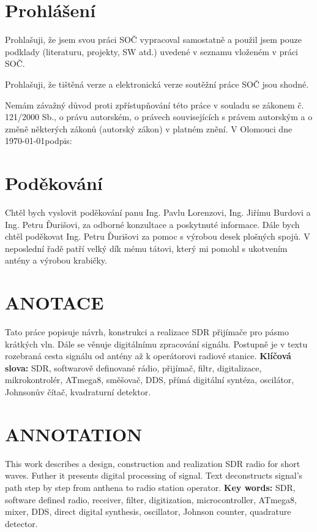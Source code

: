 \clearpage
\vspace*{\fill}
\section*{Prohlášení}
\indent\indent Prohlašuji, že jsem svou práci SOČ vypracoval samostatně a použil jsem pouze podklady (literaturu, projekty, SW atd.) uvedené v seznamu vloženém v práci SOČ.
	
Prohlašuji, že tištěná verze a elektronická verze soutěžní práce SOČ jsou shodné.
	
Nemám závažný důvod proti zpřístupňování této práce v souladu se zákonem č. 121/2000 Sb., o právu autorském, o právech souvisejících s právem autorským a o změně některých zákonů (autorský zákon) v platném znění. 
	\newline\newline
	V Olomouci dne \today\hspace*{4cm}podpis: \dotfill\newline

\clearpage
\vspace*{\fill}	
\section*{Poděkování}
\indent\indent Chtěl bych vyslovit poděkování panu Ing. Pavlu Lorenzovi, Ing. Jiřímu Burdovi a Ing. Petru Ďurišovi, za odborné konzultace a poskytnuté informace. Dále bych chtěl poděkovat Ing. Petru Ďurišovi za pomoc s výrobou desek plošných spojů. V neposlední řadě patří velký dík mému tátovi, který mi pomohl s ukotvením antény a výrobou krabičky.

\clearpage
\section*{ANOTACE}
\indent\indent Tato práce popisuje návrh, konstrukci a realizace SDR přijímače pro pásmo krátkých vln. Dále se věnuje digitálnímu zpracování signálu. Postupně je v textu rozebraná cesta signálu od antény až k operátorovi radiové stanice.
\newline\newline	
\noindent\textbf{Klíčová slova:}
SDR, softwarově definované rádio, přijímač, filtr, digitalizace, mikrokontrolér, ATmega8, směšovač, DDS, přímá digitální syntéza, oscilátor, Johnsonův čítač, kvadraturní detektor.

\vspace{3cm}

\section*{ANNOTATION}
\indent\indent This work describes a design, construction and realization SDR radio for short waves. Futher it presents digital processing of signal. Text deconstructs signal's path step by step from anthena to radio station operator.
\newline\newline
\noindent\textbf{Key words:}
SDR, software defined radio, receiver, filter, digitization, microcontroller, ATmega8, mixer, DDS, direct digital synthesis, oscillator, Johnson counter, quadrature detector.

\vspace*{\fill}
	
